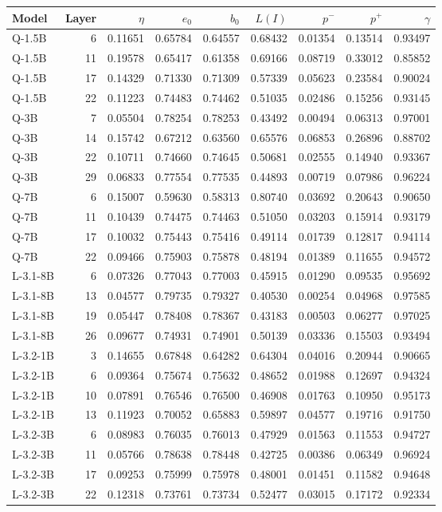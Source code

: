 \begin{tabular}{lr rrrrrrr}
\toprule
Model & Layer & $\eta$ & $e_0$ & $b_0$ & $L(I)$ & $p^-$ & $p^+$ & $\gamma$ \\
\midrule
Q-1.5B & 6 & 0.11651 & 0.65784 & 0.64557 & 0.68432 & 0.01354 & 0.13514 & 0.93497 \\
Q-1.5B & 11 & 0.19578 & 0.65417 & 0.61358 & 0.69166 & 0.08719 & 0.33012 & 0.85852 \\
Q-1.5B & 17 & 0.14329 & 0.71330 & 0.71309 & 0.57339 & 0.05623 & 0.23584 & 0.90024 \\
Q-1.5B & 22 & 0.11223 & 0.74483 & 0.74462 & 0.51035 & 0.02486 & 0.15256 & 0.93145 \\
Q-3B & 7 & 0.05504 & 0.78254 & 0.78253 & 0.43492 & 0.00494 & 0.06313 & 0.97001 \\
Q-3B & 14 & 0.15742 & 0.67212 & 0.63560 & 0.65576 & 0.06853 & 0.26896 & 0.88702 \\
Q-3B & 22 & 0.10711 & 0.74660 & 0.74645 & 0.50681 & 0.02555 & 0.14940 & 0.93367 \\
Q-3B & 29 & 0.06833 & 0.77554 & 0.77535 & 0.44893 & 0.00719 & 0.07986 & 0.96224 \\
Q-7B & 6 & 0.15007 & 0.59630 & 0.58313 & 0.80740 & 0.03692 & 0.20643 & 0.90650 \\
Q-7B & 11 & 0.10439 & 0.74475 & 0.74463 & 0.51050 & 0.03203 & 0.15914 & 0.93179 \\
Q-7B & 17 & 0.10032 & 0.75443 & 0.75416 & 0.49114 & 0.01739 & 0.12817 & 0.94114 \\
Q-7B & 22 & 0.09466 & 0.75903 & 0.75878 & 0.48194 & 0.01389 & 0.11655 & 0.94572 \\
L-3.1-8B & 6 & 0.07326 & 0.77043 & 0.77003 & 0.45915 & 0.01290 & 0.09535 & 0.95692 \\
L-3.1-8B & 13 & 0.04577 & 0.79735 & 0.79327 & 0.40530 & 0.00254 & 0.04968 & 0.97585 \\
L-3.1-8B & 19 & 0.05447 & 0.78408 & 0.78367 & 0.43183 & 0.00503 & 0.06277 & 0.97025 \\
L-3.1-8B & 26 & 0.09677 & 0.74931 & 0.74901 & 0.50139 & 0.03336 & 0.15503 & 0.93494 \\
L-3.2-1B & 3 & 0.14655 & 0.67848 & 0.64282 & 0.64304 & 0.04016 & 0.20944 & 0.90665 \\
L-3.2-1B & 6 & 0.09364 & 0.75674 & 0.75632 & 0.48652 & 0.01988 & 0.12697 & 0.94324 \\
L-3.2-1B & 10 & 0.07891 & 0.76546 & 0.76500 & 0.46908 & 0.01763 & 0.10950 & 0.95173 \\
L-3.2-1B & 13 & 0.11923 & 0.70052 & 0.65883 & 0.59897 & 0.04577 & 0.19716 & 0.91750 \\
L-3.2-3B & 6 & 0.08983 & 0.76035 & 0.76013 & 0.47929 & 0.01563 & 0.11553 & 0.94727 \\
L-3.2-3B & 11 & 0.05766 & 0.78638 & 0.78448 & 0.42725 & 0.00386 & 0.06349 & 0.96924 \\
L-3.2-3B & 17 & 0.09253 & 0.75999 & 0.75978 & 0.48001 & 0.01451 & 0.11582 & 0.94648 \\
L-3.2-3B & 22 & 0.12318 & 0.73761 & 0.73734 & 0.52477 & 0.03015 & 0.17172 & 0.92334 \\
\bottomrule
\end{tabular}
